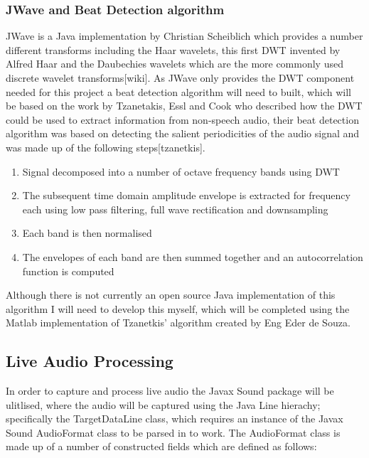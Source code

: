 \documentclass[a4paper, 11pt]{article}
\begin{document}
\subsubsection{JWave and Beat Detection algorithm}
JWave is a Java implementation by Christian Scheiblich which provides a number different transforms including the Haar wavelets, this first DWT invented by Alfred Haar and the Daubechies wavelets which are the more commonly used discrete wavelet transforms[wiki]. As JWave only provides the DWT component needed for this project a beat detection algorithm will need to built, which will be based on the work by Tzanetakis, Essl and Cook who described how the DWT could be used to extract information from non-speech audio, their beat detection algorithm was based on detecting the salient periodicities of the audio signal and was made up of the following steps[tzanetkis]. 

\begin{enumerate}
\item Signal decomposed into a number of octave frequency bands using DWT
\item The subsequent time domain amplitude envelope is extracted for frequency each using low pass filtering, full wave rectification and downsampling
\item Each band is then normalised
\item The envelopes of each band are then summed together and an autocorrelation function is computed
\end{enumerate}

Although there is not currently an open source Java implementation of this algorithm I will need to develop this myself, which will be completed using the Matlab implementation of Tzanetkis' algorithm created by Eng Eder de Souza.


\subsection{Live Audio Processing}
In order to capture and process live audio the Javax Sound package will be ulitlised, where the audio will be captured using the Java Line hierachy; specifically the TargetDataLine class, which requires an instance of the Javax Sound AudioFormat class to be parsed in to work. The AudioFormat class is made up of a number of constructed fields which are defined as follows:
\end{document}
